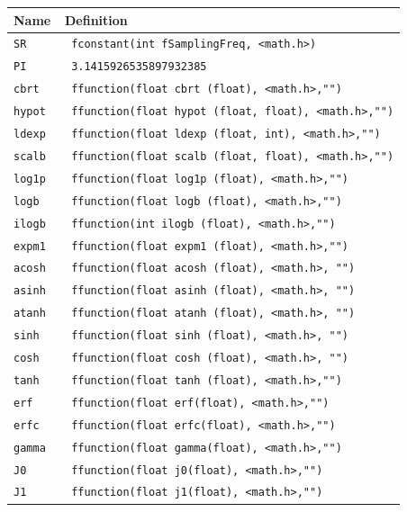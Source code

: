 \documentclass{article}
\begin{document}
\begin{tabular}{|l|l|}
\hline
\textbf{Name} & \textbf{Definition}   \\
\hline

\texttt{SR 			} & \texttt{ fconstant(int fSamplingFreq, <math.h>)} \\
\texttt{PI 			} & \texttt{ 3.1415926535897932385 } \\
\texttt{cbrt 		} & \texttt{ ffunction(float cbrt (float), <math.h>,"")} \\
\texttt{hypot 		} & \texttt{ ffunction(float hypot (float, float), <math.h>,"")} \\
\texttt{ldexp 		} & \texttt{ ffunction(float ldexp (float, int), <math.h>,"")} \\
\texttt{scalb 		} & \texttt{ ffunction(float scalb (float, float), <math.h>,"")} \\
\texttt{log1p 		} & \texttt{ ffunction(float log1p (float), <math.h>,"")} \\
\texttt{logb 		} & \texttt{ ffunction(float logb (float), <math.h>,"")} \\
\texttt{ilogb 		} & \texttt{ ffunction(int ilogb (float), <math.h>,"")} \\
\texttt{expm1 		} & \texttt{ ffunction(float expm1 (float), <math.h>,"")} \\
\texttt{acosh		} & \texttt{ ffunction(float acosh (float), <math.h>, "")} \\
\texttt{asinh		} & \texttt{ ffunction(float asinh (float), <math.h>, "")} \\
\texttt{atanh		} & \texttt{ ffunction(float atanh (float), <math.h>, "")} \\
\texttt{sinh		} & \texttt{ ffunction(float sinh (float), <math.h>, "")} \\
\texttt{cosh		} & \texttt{ ffunction(float cosh (float), <math.h>, "")} \\
\texttt{tanh		} & \texttt{ ffunction(float tanh (float), <math.h>,"")} \\
\texttt{erf			} & \texttt{ ffunction(float erf(float), <math.h>,"")} \\
\texttt{erfc		} & \texttt{ ffunction(float erfc(float), <math.h>,"")} \\
\texttt{gamma		} & \texttt{ ffunction(float gamma(float), <math.h>,"")} \\
\texttt{J0			} & \texttt{ ffunction(float j0(float), <math.h>,"")} \\
\texttt{J1			} & \texttt{ ffunction(float j1(float), <math.h>,"")} \\

\end{tabular}
\end{document}

